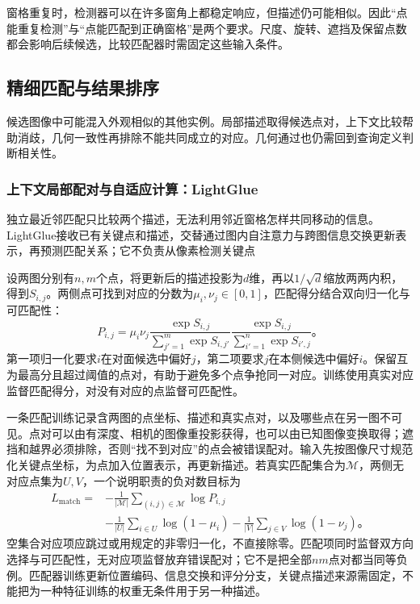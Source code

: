 窗格重复时，检测器可以在许多窗角上都稳定响应，但描述仍可能相似。因此“点能重复检测”与“点能匹配到正确窗格”是两个要求。尺度、旋转、遮挡及保留点数都会影响后续候选，比较匹配器时需固定这些输入条件。

\subsection{精细匹配与结果排序}
\label{sec:vision-recognition-verification}

候选图像中可能混入外观相似的其他实例。局部描述取得候选点对，上下文比较帮助消歧，几何一致性再排除不能共同成立的对应。几何通过也仍需回到查询定义判断相关性。

\Needspace{55mm}
\subsubsection{上下文局部配对与自适应计算：LightGlue}
\label{sec:vision-recognition-lightglue}

独立最近邻匹配只比较两个描述，无法利用邻近窗格怎样共同移动的信息。LightGlue接收已有关键点和描述，交替通过图内自注意力与跨图信息交换更新表示，再预测匹配关系；它不负责从像素检测关键点

设两图分别有$n,m$个点，将更新后的描述投影为$d$维，再以$1/\sqrt d$缩放两两内积，得到$S_{i,j}$。两侧点可找到对应的分数为$\mu_i,\nu_j\in[0,1]$，匹配得分结合双向归一化与可匹配性：
\begin{equation}
 P_{i,j}=\mu_i\nu_j
 \frac{\exp S_{i,j}}{\sum_{j'=1}^{m}\exp S_{i,j'}}
 \frac{\exp S_{i,j}}{\sum_{i'=1}^{n}\exp S_{i',j}}\text{。}
 \label{eq:vision-lightglue-score}
\end{equation}
第一项归一化要求$i$在对面候选中偏好$j$，第二项要求$j$在本侧候选中偏好$i$。保留互为最高分且超过阈值的点对，有助于避免多个点争抢同一对应。训练使用真实对应监督匹配得分，对没有对应的点监督可匹配性。

一条匹配训练记录含两图的点坐标、描述和真实点对，以及哪些点在另一图不可见。点对可以由有深度、相机的图像重投影获得，也可以由已知图像变换取得；遮挡和越界必须排除，否则“找不到对应”的点会被错误配对。输入先按图像尺寸规范化关键点坐标，为点加入位置表示，再更新描述。若真实匹配集合为$\mathcal M$，两侧无对应点集为$U,V$，一个说明职责的负对数目标为
\begin{equation}
 \begin{aligned}
 L_{\mathrm{match}}={}&-\frac1{|\mathcal M|}
 \sum_{(i,j)\in\mathcal M}\log P_{i,j}\\
 &-\frac1{|U|}\sum_{i\in U}\log(1-\mu_i)
 -\frac1{|V|}\sum_{j\in V}\log(1-\nu_j)\text{。}
 \end{aligned}
 \label{eq:vision-lightglue-training-process}
\end{equation}
空集合对应项应跳过或用规定的非零归一化，不直接除零。匹配项同时监督双方向选择与可匹配性，无对应项监督放弃错误配对；它不是把全部$n m$点对都当同等负例。匹配器训练更新位置编码、信息交换和评分分支，关键点描述来源需固定，不能把为一种特征训练的权重无条件用于另一种描述。

